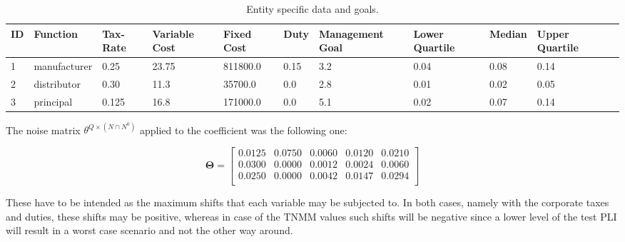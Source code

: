 \documentclass[conference,final,a4paper]{IEEEtran}
\begin{document}
\begin{table}[]
\centering
\caption{Entity specific data and goals.}
\label{es-goal}
\begin{tabular}{@{}lllllllllll@{}}
\toprule
ID & Function & Tax-Rate   & Variable Cost & Fixed Cost    & Duty & Management Goal & Lower Quartile & Median & Upper Quartile \\ \midrule
1  & manufacturer & 0.25  & 23.75 & 811800.0 & 0.15   & 3.2   & 0.04      & 0.08   & 0.14      \\
2  & distributor  & 0.30  & 11.3  & 35700.0  & 0.0    & 2.8   & 0.01      & 0.02   & 0.05      \\
3  & principal    & 0.125 & 16.8  & 171000.0 & 0.0    & 5.1   & 0.02      & 0.07   & 0.14      \\ \bottomrule
\end{tabular}
\end{table}

The noise matrix \(\theta^{Q \times (N\cap N^0) }\) applied to the
coefficient was the following one:

\[ \mathbf{\Theta} =  \begin{bmatrix}
 0.0125 & 0.0750 & 0.0060 & 0.0120 & 0.0210 \\
 0.0300 & 0.0000 & 0.0012 & 0.0024 & 0.0060 \\
 0.0250 & 0.0000 & 0.0042 & 0.0147 & 0.0294 \\
 \end{bmatrix} \]

These have to be intended as the maximum shifts that each variable may
be subjected to. In both cases, namely with the corporate taxes and duties,
these shifts may be positive, whereas in case of the TNMM values such
shifts will be negative since a lower level of the test PLI will result
in a worst case scenario and not the other way around.
\end{document}
